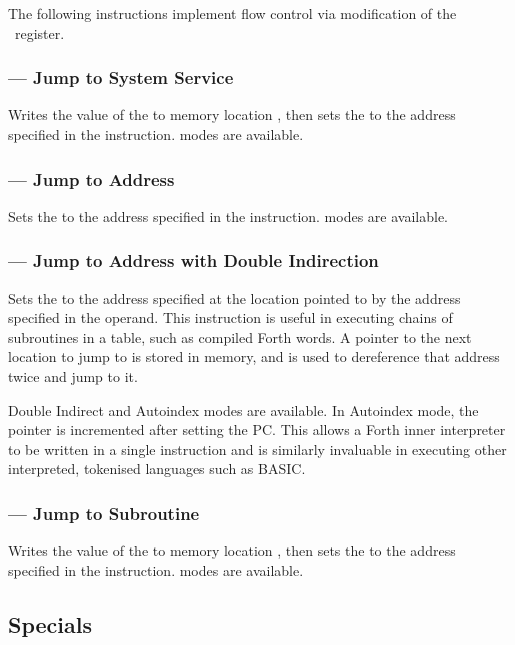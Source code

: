 The following instructions implement flow control via modification of the
\PC\ register.

\subsubsection{ — Jump to System Service}
\label{sec:instruction-TRAP}

Writes the value of the \PC{} to memory location , then sets the \PC
to the address specified in the instruction. \AMGroupTwo modes are available.

\subsubsection{ — Jump to Address}
\label{sec:instruction-JMP}

Sets the \PC{} to the address specified in the instruction. \AMGroupTwo modes
are available.

\subsubsection{ — Jump to Address with Double Indirection}
\label{sec:instruction-JMPII}

Sets the \PC{} to the address specified at the location pointed to by the
address specified in the operand. This instruction is useful in executing
chains of subroutines in a table, such as compiled Forth words. A pointer to
the next location to jump to is stored in memory, and  is used to
dereference that address twice and jump to it.

Double Indirect and Autoindex modes are available. In Autoindex mode, the
pointer is incremented after setting the PC. This allows a Forth inner
interpreter to be written in a single instruction and is similarly invaluable
in executing other interpreted, tokenised languages such as BASIC.

\subsubsection{ — Jump to Subroutine}
\label{sec:instruction-JSR}

Writes the value of the \PC{} to memory location , then sets the
\PC{} to the address specified in the instruction. \AMGroupTwo modes are
available.

\subsection{Specials}

